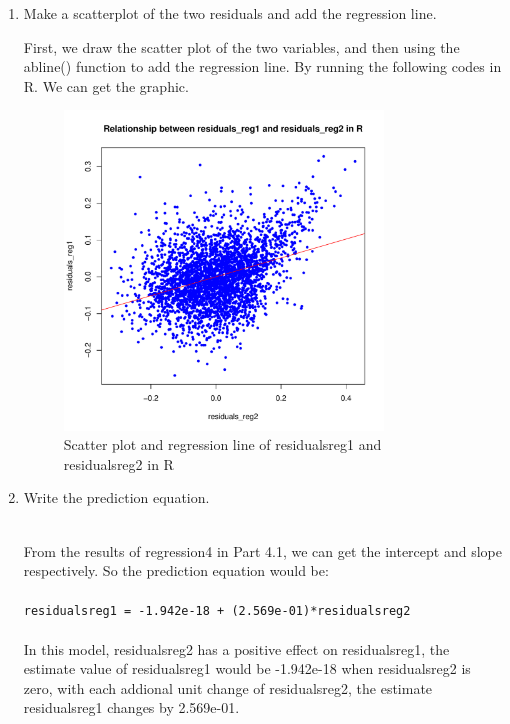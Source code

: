 \documentclass[12pt,letterpaper]{article}
\begin{document}
\begin{enumerate}
		\item Make a scatterplot of the two residuals and add the regression line. 	\vspace{.16cm}
		
			\noindent First, we draw the scatter plot of the two variables, and then using the abline() function to add the regression line. By running the following codes in R. We can get the graphic.
		
		
		
		\begin{figure}[h]
			\centering
			\includegraphics[width=0.8\textwidth]{Scatter plot and regression line of residuals_reg1 and residuals_reg2 in R.pdf}
			\caption{Scatter plot and regression line of residuals\textunderscore{}reg1 and residuals\textunderscore{}reg2 in R}
			\label{fig:pdf}
		\end{figure}
		\vspace{.15cm}
		
		\newpage
		\item Write the prediction equation.
		
		\noindent \\From the results of regression4 in Part 4.1, we can get the intercept and slope respectively. So the prediction equation would be:\\  \\ \texttt{residuals\textunderscore{}reg1 = -1.942e-18 + (2.569e-01)*residuals\textunderscore{}reg2} \\  \\In this model, residuals\textunderscore{}reg2 has a positive effect on residuals\textunderscore{}reg1, the estimate value of residuals\textunderscore{}reg1 would be -1.942e-18 when residuals\textunderscore{}reg2 is zero, with each addional unit change of residuals\textunderscore{}reg2, the estimate residuals\textunderscore{}reg1 changes by 2.569e-01.\\
		
	\end{enumerate}
	
\end{document}
